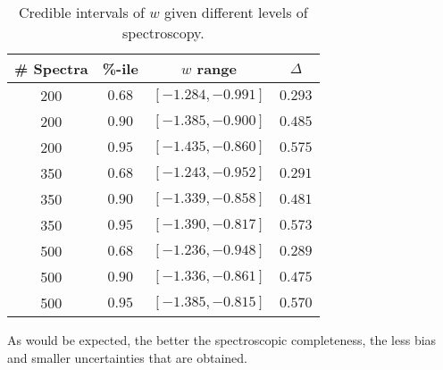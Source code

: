 \documentclass[preprint]{aastex}
\begin{document}
\begin{table}[htbp] 
\centering
\begin{tabular}{|cc|cc|}
\hline
\# Spectra & \%-ile & $w$ range & $\Delta$\\ \hline
200& $0.68$ & $[-1.284, -0.991]$ & $0.293$ \\
200& $0.90$ & $[-1.385, -0.900]$ & $0.485$ \\
200& $0.95$ & $[-1.435, -0.860]$ & $0.575$ \\
350& $0.68$ & $[-1.243, -0.952]$ & $0.291$ \\
350& $0.90$ & $[-1.339, -0.858]$ & $0.481$ \\
350& $0.95$ & $[-1.390, -0.817]$ & $0.573$ \\
500& $0.68$ & $[-1.236, -0.948]$ & $0.289$ \\
500& $0.90$ & $[-1.336, -0.861]$ & $0.475$ \\
500& $0.95$ & $[-1.385, -0.815]$ & $0.570$ \\
\hline
\end{tabular}
\caption{Credible intervals of $w$ given different levels of spectroscopy.  \label{compare:tab}}
\end{table}

As would be expected, the better the spectroscopic completeness, the less bias
and smaller uncertainties that are obtained.
\end{document}
